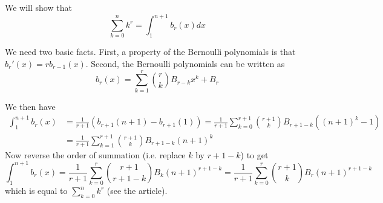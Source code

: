 \documentclass[12pt]{article}
\begin{document}
We will show that
\[\sum_{k=0}^n k^r = \int_1^{n+1} b_r(x)dx\]

We need two basic facts. First, a property of the Bernoulli polynomials is that $b_r'(x)=rb_{r-1}(x)$. Second, the Bernoulli polynomials can be written as
\[b_r(x) = \sum_{k=1}^r \binom{r}{k}B_{r-k}x^k + B_r\]

We then have
\begin{align*}
\int_1^{n+1} b_r(x)&=\frac{1}{r+1}(b_{r+1}(n+1)-b_{r+1}(1)) = \frac{1}{r+1}\sum_{k=0}^{r+1}\binom{r+1}{k}B_{r+1-k}((n+1)^k-1) \\
&= \frac{1}{r+1}\sum_{k=1}^{r+1}\binom{r+1}{k}B_{r+1-k}(n+1)^k
\end{align*}
Now reverse the order of summation (i.e. replace $k$ by $r+1-k$) to get
\[
\int_1^{n+1} b_r(x)=\frac{1}{r+1}\sum_{k=0}^r\binom{r+1}{r+1-k}B_k(n+1)^{r+1-k}=\frac{1}{r+1}\sum_{k=0}^r\binom{r+1}{k}B_r (n+1)^{r+1-k}\]
which is equal to $\sum_{k=0}^n k^r$ (see the  article).
\end{document}

